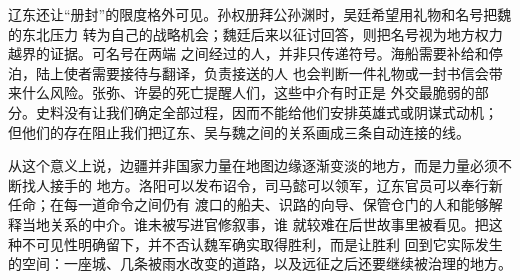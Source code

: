 辽东还让“册封”的限度格外可见。孙权册拜公孙渊时，吴廷希望用礼物和名号把魏的东北压力
转为自己的战略机会；魏廷后来以征讨回答，则把名号视为地方权力越界的证据。可名号在两端
之间经过的人，并非只传递符号。海船需要补给和停泊，陆上使者需要接待与翻译，负责接送的人
也会判断一件礼物或一封书信会带来什么风险。张弥、许晏的死亡提醒人们，这些中介有时正是
外交最脆弱的部分。史料没有让我们确定全部过程，因而不能给他们安排英雄式或阴谋式动机；
但他们的存在阻止我们把辽东、吴与魏之间的关系画成三条自动连接的线。

从这个意义上说，边疆并非国家力量在地图边缘逐渐变淡的地方，而是力量必须不断找人接手的
地方。洛阳可以发布诏令，司马懿可以领军，辽东官员可以奉行新任命；在每一道命令之间仍有
渡口的船夫、识路的向导、保管仓门的人和能够解释当地关系的中介。谁未被写进官修叙事，谁
就较难在后世故事里被看见。把这种不可见性明确留下，并不否认魏军确实取得胜利，而是让胜利
回到它实际发生的空间：一座城、几条被雨水改变的道路，以及远征之后还要继续被治理的地方。
